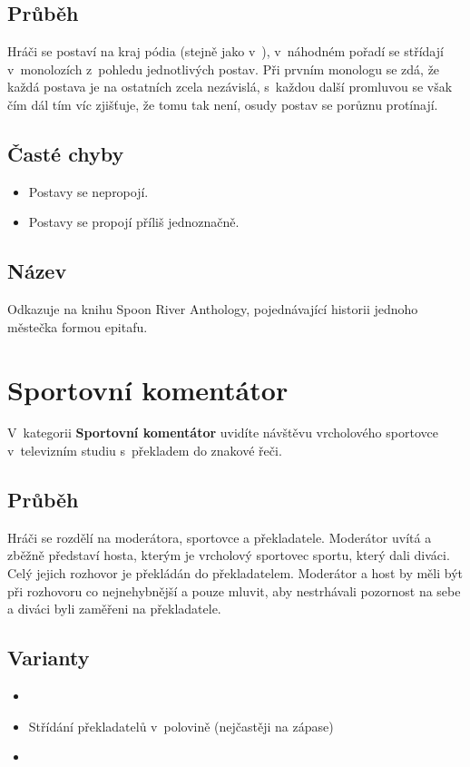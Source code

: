 \subsection{Průběh} Hráči se postaví na kraj pódia (stejně jako v~), v~náhodném pořadí se střídají v~monolozích z~pohledu jednotlivých postav. 
Při prvním monologu se zdá, že každá postava je na ostatních zcela nezávislá, s~každou další promluvou se však čím dál tím víc zjišťuje, že tomu tak není, osudy postav se porůznu protínají. 
 
\subsection{Časté chyby} \begin{itemize}
\item Postavy se nepropojí.
\item Postavy se propojí příliš jednoznačně.
\end{itemize}
 
\subsection{Název} Odkazuje na knihu Spoon River Anthology, pojednávající historii jednoho městečka formou epitafu. 
 
 
 
 
\needspace{5cm} \section{Sportovní komentátor} \label{sportovní komentátor}  
 
V~kategorii \textbf{Sportovní komentátor} uvidíte návštěvu vrcholového sportovce v~televizním studiu s~překladem do znakové řeči. 
 
\subsection{ Průběh } Hráči se rozdělí na moderátora, sportovce a překladatele. Moderátor uvítá a zběžně představí hosta, kterým je vrcholový sportovec sportu, který dali diváci. Celý jejich rozhovor je překládán do  překladatelem. Moderátor a host by měli být při rozhovoru co nejnehybnější a pouze mluvit, aby nestrhávali pozornost na sebe a diváci byli zaměřeni na překladatele. 
 
\subsection{ Varianty } \begin{itemize}
\item  {}
\item  Střídání překladatelů v~polovině (nejčastěji na zápase)
\item  {}
\end{itemize}
 
